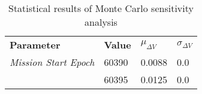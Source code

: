 
                    \begin{table}[]
                    \centering
                    \begin{tabular}{l l l l}
                    \rowcolor[HTML]{EFEFEF} \textbf{Parameter} & \textbf{Value} & \textbf{$\mu_{\Delta V}$} & \textbf{$\sigma_{\Delta V}$} \\
                    \textit{Mission Start Epoch} & 60390 & 0.0088 & 0.0 \\
 & 60395 & 0.0125 & 0.0 \\

                    \end{tabular}
                    \caption{Statistical results of Monte Carlo sensitivity analysis}
                    \label{tab:SensitivityAnalysis}
                    \end{table}
                    